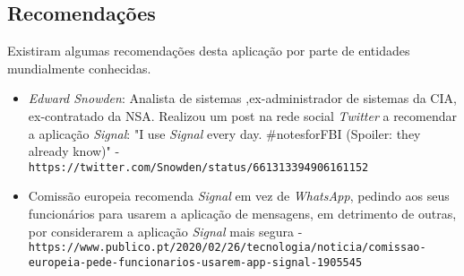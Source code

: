 \subsection{Recomendações}
\label{sec:recomendacoes}
Existiram algumas recomendações desta aplicação por parte de entidades mundialmente conhecidas.
\begin{itemize}
    \item \textit{Edward Snowden}: Analista de sistemas ,ex-administrador de sistemas da CIA, ex-contratado da NSA. Realizou um post na rede social \textit{Twitter} a recomendar a aplicação \textit{Signal}: "I use \textit{Signal} every day. \#notesforFBI (Spoiler: they already know)" - \nolinkurl{https://twitter.com/Snowden/status/661313394906161152}
    \item Comissão europeia recomenda \textit{Signal} em vez de \textit{WhatsApp}, pedindo aos seus funcionários para usarem a aplicação de mensagens, em detrimento de outras, por considerarem a aplicação \textit{Signal} mais segura - \nolinkurl{https://www.publico.pt/2020/02/26/tecnologia/noticia/comissao-europeia-pede-funcionarios-usarem-app-signal-1905545}
\end{itemize}
